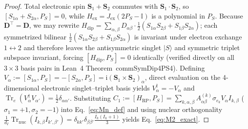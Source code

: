 \documentclass[twocolumn,10pt,amsmath,amssymb,floatfix]{revtex4-2}
\theoremstyle{plain}
\theoremstyle{definition}
\newcommand{\ii}{\mathrm{i}}
\newcommand{\Tr}{\operatorname{Tr}}
\newcommand{\PS}{P_S}
\newcommand{\HRP}{H_{\mathrm{RP}}}
\newcommand{\Hex}{H_{\mathrm{ex}}}
\newcommand{\Hdip}{H_{\mathrm{dip}}}
\newcommand{\leanid}[1]{{\footnotesize\ttfamily\def\_{\textunderscore\allowbreak}#1}}
\begin{document}
\begin{proof}
Total electronic spin $\mathbf{S}_1 + \mathbf{S}_2$ commutes with $\mathbf{S}_1\cdot\mathbf{S}_2$, so $[S_{1\alpha}+S_{2\alpha},\PS]=0$, while $\Hex = J_{\mathrm{ex}}(2\PS-\mathbb{I})$ is a polynomial in $\PS$. Because $\mathbf{D}^\top = \mathbf{D}$, we may rewrite $\Hdip = \sum_{\alpha,\beta} D_{\alpha\beta}\cdot\frac{1}{2}(S_{1\alpha}S_{2\beta} + S_{1\beta}S_{2\alpha})$; each symmetrized bilinear $\frac{1}{2}(S_{1\alpha}S_{2\beta} + S_{1\beta}S_{2\alpha})$ is invariant under electron exchange $1 \leftrightarrow 2$ and therefore leaves the antisymmetric singlet $|S\rangle$ and symmetric triplet subspace invariant, forcing $[\Hdip,\PS] = 0$ identically (verified directly on all $3\times 3$ basis pairs in Lean~4 Theorem~\leanid{comm\_SymDip4\_PS4}). Defining $V_\alpha := [S_{1\alpha}, \PS] = -[S_{2\alpha}, \PS] = \ii(\mathbf{S}_1 \times \mathbf{S}_2)_\alpha$, direct evaluation on the 4-dimensional electronic singlet--triplet basis yields $V_\alpha^\dagger = -V_\alpha$ and $\Tr_e(V_\alpha^\dagger V_{\alpha'}) = \frac{1}{2}\delta_{\alpha\alpha'}$. Substituting $C_1 := [\HRP,\PS] = \sum_{k,\alpha,\beta} A^{(k)}_{\alpha\beta} \sigma_{e_k} V_\alpha I_{k,\beta}$ ($\sigma_1=+1, \sigma_2=-1$) into Eq.~\eqref{eq:Mn_def} and using nuclear orthogonality $\frac{1}{d_I}\Tr_{\mathrm{nuc}}(I_{k,\beta} I_{k',\beta'}) = \delta_{kk'}\delta_{\beta\beta'}\frac{I_k(I_k+1)}{3}$ yields Eq.~\eqref{eq:M2_exact}.
\end{proof}
\end{document}
